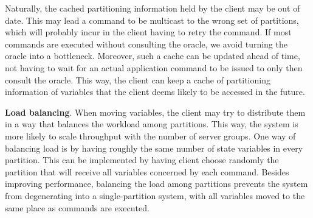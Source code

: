 Naturally, the cached partitioning information held by the client may be out of
date. This may lead a command to be multicast to the wrong set of partitions,
which will probably incur in the client having to retry the command.
If most commands are executed without consulting the oracle, we avoid turning
the oracle into a bottleneck. Moreover, such a cache can be updated ahead of
time, not having to wait for an actual application command to be issued to only
then consult the oracle. This way, the client can keep a cache of partitioning
information of variables that the client deems likely to be accessed in the
future.


\textbf{Load balancing}. When moving variables, the client may try to distribute
them in a way that balances the workload among partitions. This way, the system
is more likely to scale throughput with the number of server groups. One way of
balancing load is by having roughly the same number of state variables in every
partition. This can be implemented by having client choose randomly the
partition that will receive all variables concerned by each command. Besides
improving performance, balancing the load among partitions prevents the system
from degenerating into a single-partition system, with all variables moved to
the same place as commands are executed.



